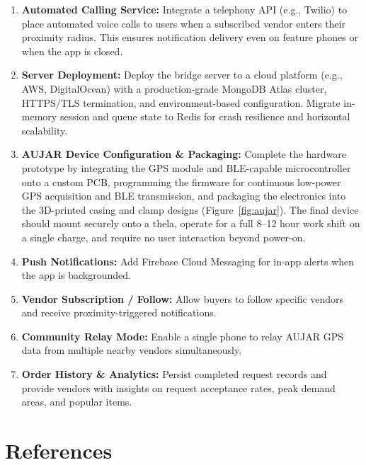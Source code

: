 \documentclass[12pt, a4paper]{article}
\begin{document}
\begin{enumerate}[leftmargin=*, noitemsep]
    \item \textbf{Automated Calling Service:} Integrate a telephony API (e.g., Twilio) to place automated voice calls to users when a subscribed vendor enters their proximity radius. This ensures notification delivery even on feature phones or when the app is closed.

    \item \textbf{Server Deployment:} Deploy the bridge server to a cloud platform (e.g., AWS, DigitalOcean) with a production-grade MongoDB Atlas cluster, HTTPS/TLS termination, and environment-based configuration. Migrate in-memory session and queue state to Redis for crash resilience and horizontal scalability.

    \item \textbf{AUJAR Device Configuration \& Packaging:} Complete the hardware prototype by integrating the GPS module and BLE-capable microcontroller onto a custom PCB, programming the firmware for continuous low-power GPS acquisition and BLE transmission, and packaging the electronics into the 3D-printed casing and clamp designs (Figure~\ref{fig:aujar}). The final device should mount securely onto a thela, operate for a full 8--12 hour work shift on a single charge, and require no user interaction beyond power-on.

    \item \textbf{Push Notifications:} Add Firebase Cloud Messaging for in-app alerts when the app is backgrounded.

    \item \textbf{Vendor Subscription / Follow:} Allow buyers to follow specific vendors and receive proximity-triggered notifications.

    \item \textbf{Community Relay Mode:} Enable a single phone to relay AUJAR GPS data from multiple nearby vendors simultaneously.

    \item \textbf{Order History \& Analytics:} Persist completed request records and provide vendors with insights on request acceptance rates, peak demand areas, and popular items.
\end{enumerate}

\section{References}
\end{document}
